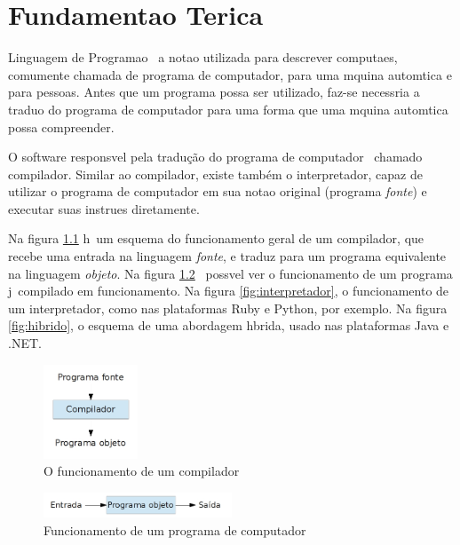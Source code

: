 \chapter{Fundamenta\ca o Te\oh rica}

\label{pro:fundamentacao}

Linguagem de Programa\ca o \eh\ a nota\ca o utilizada para descrever computa\co es, comumente chamada de programa de computador, para uma m\ah quina autom\ah tica e para pessoas. Antes que um programa possa ser utilizado, faz-se necess\ah ria a tradu\ca o do programa de computador para uma forma que uma m\ah quina autom\ah tica possa compreender.

O software respons\ah vel pela tradução do programa de computador \eh\ chamado compilador. Similar ao compilador, existe também o interpretador, capaz de utilizar o programa de computador em sua nota\ca o original (programa \emph{fonte}) e executar suas instru\co es diretamente.

Na figura \ref{fig:compilador} h\ah\ um esquema do funcionamento geral de um compilador, que recebe uma entrada na linguagem \emph{fonte}, e traduz para um programa equivalente na linguagem \emph{objeto}. Na figura \ref{fig:execucao} \eh\ poss\ih vel ver o funcionamento de um programa j\ah\ compilado em funcionamento. Na figura \ref{fig:interpretador}, o funcionamento de um interpretador, como nas plataformas Ruby e Python, por exemplo. Na figura \ref{fig:hibrido}, o esquema de uma abordagem h\ih brida, usado nas plataformas Java e .NET.

\begin{figure}[htp]
  \begin{center}
    \includegraphics[width=0.25\textwidth]{figuras/compilador}
  \end{center}
  \caption{O funcionamento de um compilador}
  \label{fig:compilador}
\end{figure}

\begin{figure}[htp]
  \begin{center}
    \includegraphics[width=0.5\textwidth]{figuras/execucao}
  \end{center}
  \caption{Funcionamento de um programa de computador}
  \label{fig:execucao}
\end{figure}

